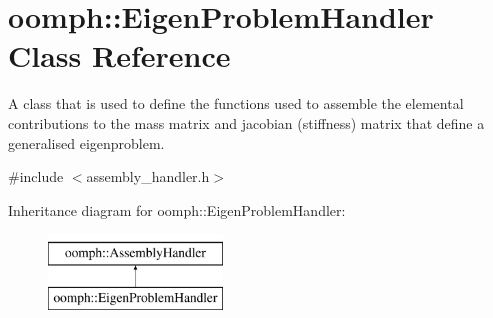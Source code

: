 \hypertarget{classoomph_1_1EigenProblemHandler}{}\section{oomph\+:\+:Eigen\+Problem\+Handler Class Reference}
\label{classoomph_1_1EigenProblemHandler}


A class that is used to define the functions used to assemble the elemental contributions to the mass matrix and jacobian (stiffness) matrix that define a generalised eigenproblem.  




{\ttfamily \#include $<$assembly\+\_\+handler.\+h$>$}

Inheritance diagram for oomph\+:\+:Eigen\+Problem\+Handler\+:\begin{figure}[H]
\begin{center}
\leavevmode
\includegraphics[height=2.000000cm]{classoomph_1_1EigenProblemHandler}
\end{center}
\end{figure}
